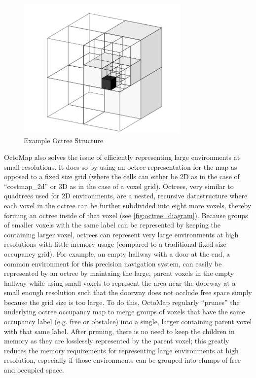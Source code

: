 \begin{figure}
\centering
\includegraphics[width=0.75\textwidth]{images/octree_diagram}
\caption[Example Octree Structure]{Example Octree Structure \autocite{octomap} \label{fig:octree_diagram}}
\end{figure}

OctoMap also solves the issue of efficiently representing large environments at small resolutions. It does so by using an octree representation for the map as opposed to a fixed size grid (where the cells can either be 2D as in the case of ``costmap\_2d'' or 3D as in the case of a voxel grid). Octrees, very similar to quadtrees used for 2D environments, are a nested, recursive datastructure where each voxel in the octree can be further subdivided into eight more voxels, thereby forming an octree inside of that voxel (see \autoref{fig:octree_diagram}). Because groups of smaller voxels with the same label can be represented by keeping the containing larger voxel, octrees can represent very large environments at high resolutions with little memory usage (compared to a traditional fixed size occupancy grid). For example, an empty hallway with a door at the end, a common environment for this precision navigation system, can easily be represented by an octree by maintaing the large, parent voxels in the empty hallway while using small voxels to represent the area near the doorway at a small enough resolution such that the doorway does not occlude free space simply because the grid size is too large. To do this, OctoMap regularly ``prunes'' the underlying octree occupancy map to merge groups of voxels that have the same occupancy label (e.g. free or obstalce) into a single, larger containing parent voxel with that same label. After pruning, there is no need to keep the children in memory as they are losslessly represented by the parent voxel; this greatly reduces the memory requirements for representing large environments at high resolution, especially if those environments can be grouped into clumps of free and occupied space.

